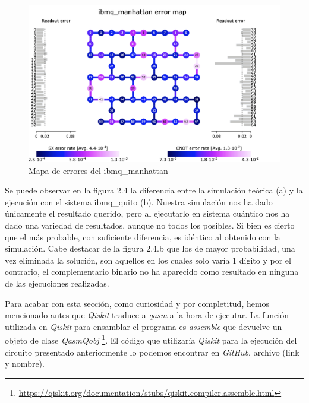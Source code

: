  \newline
 

  \begin{figure}[H]
    \centering
    \includegraphics[width=\textwidth]{TFG/imagenes/system_error_manhattan.png}
    \caption{Mapa de errores del ibmq\_manhattan} 
 \end{figure}

Se puede observar en la figura 2.4 la diferencia entre la simulación teórica (a) y la ejecución con el sistema ibmq\_quito (b). Nuestra simulación nos ha dado únicamente el resultado querido, pero al ejecutarlo en sistema cuántico nos ha dado una variedad de resultados, aunque no todos los posibles. Si bien es cierto que el más probable, con suficiente diferencia, es idéntico al obtenido con la simulación. Cabe destacar de la figura 2.4.b que los de mayor probabilidad, una vez eliminada la solución, son aquellos en los cuales solo varía 1 dígito y por el contrario, el complementario binario no ha aparecido como resultado en ninguna de las ejecuciones realizadas. \newline

Para acabar con esta sección, como curiosidad y por completitud, hemos mencionado antes que \textit{Qiskit} traduce a \textit{qasm} a la hora de ejecutar. La función utilizada en \textit{Qiskit} para ensamblar el programa es \textit{assemble} que devuelve un objeto de clase \textit{QasmQobj} \footnote{\url{https://qiskit.org/documentation/stubs/qiskit.compiler.assemble.html}}. El código que utilizaría \textit{Qiskit} para la ejecución del circuito presentado anteriormente lo podemos encontrar en \textit{GitHub}, archivo (link y nombre).\newline

